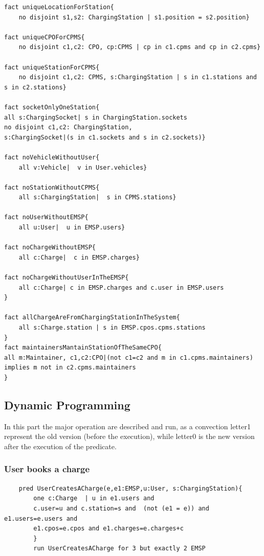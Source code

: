 \begin{verbatim}
fact uniqueLocationForStation{
	no disjoint s1,s2: ChargingStation | s1.position = s2.position}

fact uniqueCPOForCPMS{
	no disjoint c1,c2: CPO, cp:CPMS | cp in c1.cpms and cp in c2.cpms}

fact uniqueStationForCPMS{
	no disjoint c1,c2: CPMS, s:ChargingStation | s in c1.stations and s in c2.stations}

fact socketOnlyOneStation{
all s:ChargingSocket| s in ChargingStation.sockets
no disjoint c1,c2: ChargingStation, 
s:ChargingSocket|(s in c1.sockets and s in c2.sockets)}

fact noVehicleWithoutUser{
	all v:Vehicle|  v in User.vehicles}

fact noStationWithoutCPMS{
	all s:ChargingStation|  s in CPMS.stations}

fact noUserWithoutEMSP{
	all u:User|  u in EMSP.users}

fact noChargeWithoutEMSP{
	all c:Charge|  c in EMSP.charges}

fact noChargeWithoutUserInTheEMSP{
	all c:Charge| c in EMSP.charges and c.user in EMSP.users
}

fact allChargeAreFromChargingStationInTheSystem{
	all s:Charge.station | s in EMSP.cpos.cpms.stations 
}
fact maintainersMantainStationOfTheSameCPO{
all m:Maintainer, c1,c2:CPO|(not c1=c2 and m in c1.cpms.maintainers) 
implies m not in c2.cpms.maintainers 
}
\end{verbatim}

\subsection{Dynamic Programming}
In this part the major operation are described and run, as a convection letter1 represent the old version (before the execution), while letter0 is the new version after the execution of the predicate.

\subsubsection{User books a charge}
\begin{verbatim}
    pred UserCreatesACharge(e,e1:EMSP,u:User, s:ChargingStation){
        one c:Charge  | u in e1.users and
        c.user=u and c.station=s and  (not (e1 = e)) and  e1.users=e.users and
        e1.cpos=e.cpos and e1.charges=e.charges+c
        }
        run UserCreatesACharge for 3 but exactly 2 EMSP    
\end{verbatim}

